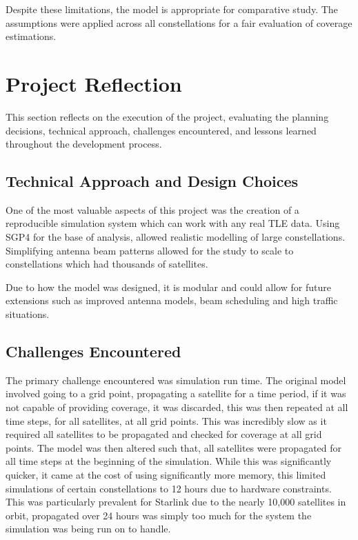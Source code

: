 Despite these limitations, the model is appropriate for comparative study. The assumptions were applied across all constellations for a fair evaluation of  coverage estimations. 

\section{Project Reflection}
This section reflects on the execution of the project, evaluating the planning decisions, technical approach, challenges encountered, and lessons learned throughout the development process. 


\subsection{Technical Approach and Design Choices}
One of the most valuable aspects of this project was the creation of a reproducible simulation system which can work with any real TLE data. Using SGP4 for the base of analysis, allowed realistic modelling of large constellations. Simplifying antenna beam patterns allowed for the study to scale to constellations which had thousands of satellites.

Due to how the model was designed, it is modular and could allow for future extensions such as improved antenna models, beam scheduling and high traffic situations. 

\subsection{Challenges Encountered}
The primary challenge encountered was simulation run time. The original model involved going to a grid point, propagating a satellite for a time period, if it was not capable of providing coverage, it was discarded, this was then repeated at all time steps, for all satellites, at all grid points. This was incredibly slow as it required all satellites to be propagated and checked for coverage at all grid points. The model was then altered such that, all satellites were propagated for all time steps at the beginning of the simulation. While this was significantly quicker, it came at the cost of using significantly more memory, this limited simulations of certain constellations to 12 hours due to hardware constraints. This was particularly prevalent for Starlink due to the nearly 10,000 satellites in orbit, propagated over 24 hours was simply too much for the system the simulation was being run on to handle. 

